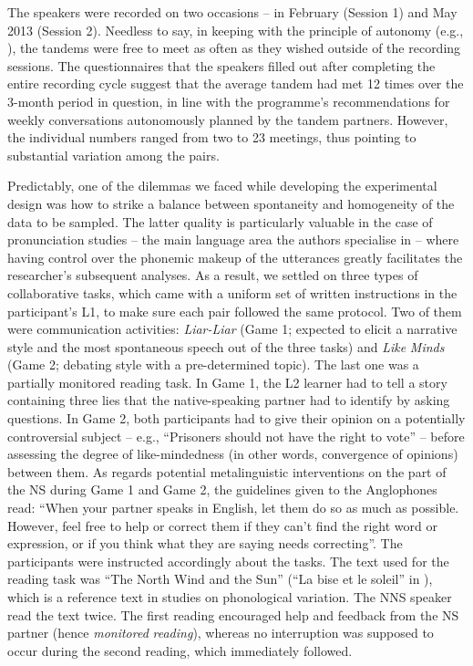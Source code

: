 \documentclass[output=paper,colorlinks,citecolor=brown,modfonts,nonflat]{../langscibook}
\begin{document}
The speakers were recorded on two occasions – in February (Session 1) and May 2013 (Session 2). Needless to say, in keeping with the principle of autonomy (e.g., \citealt{BrammertsCalvert2003}), the tandems were free to meet as often as they wished outside of the recording sessions. The questionnaires that the speakers filled out after completing the entire recording cycle suggest that the average tandem had met 12 times over the 3-month period in question, in line with the programme’s recommendations for weekly conversations autonomously planned by the tandem partners. However, the individual numbers ranged from two to 23 meetings, thus pointing to substantial variation among the pairs.

Predictably, one of the dilemmas we faced while developing the experimental design was how to strike a balance between spontaneity and homogeneity of the data to be sampled. The latter quality is particularly valuable in the case of pronunciation studies – the main language area the authors specialise in – where having control over the phonemic makeup of the utterances greatly facilitates the researcher’s subsequent analyses. As a result, we settled on three types of collaborative tasks, which came with a uniform set of written instructions in the participant’s L1, to make sure each pair followed the same protocol. Two of them were communication activities: \textit{Liar-Liar} (Game 1; expected to elicit a narrative style and the most spontaneous speech out of the three tasks) and \textit{Like} \textit{Minds} (Game 2; debating style with a pre-determined topic). The last one was a partially monitored reading task. In Game 1, the L2 learner had to tell a story containing three lies that the native-speaking partner had to identify by asking questions. In Game 2, both participants had to give their opinion on a potentially controversial subject – e.g., “Prisoners should not have the right to vote” – before assessing the degree of like-mindedness (in other words, convergence of opinions) between them. As regards potential metalinguistic interventions on the part of the NS during Game 1 and Game 2, the guidelines given to the Anglophones read: “When your partner speaks in English, let them do so as much as possible. However, feel free to help or correct them if they can’t find the right word or expression, or if you think what they are saying needs correcting”. The  participants were instructed accordingly about the  tasks. The text used for the reading task was “The North Wind and the Sun” (“La bise et le soleil” in ), which is a reference text in studies on phonological variation. The NNS speaker read the text twice. The first reading encouraged help and feedback from the NS partner (hence \textit{monitored} \textit{reading}), whereas no interruption was supposed to occur during the second reading, which immediately followed.
\end{document}
